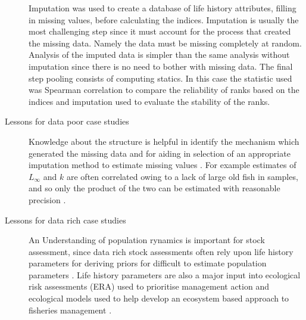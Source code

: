\documentclass[12pt,doublespacing,a4paper]{ouparticle}
\begin{document}
\begin{description}
    Imputation was used to create a database of life history attributes, filling in missing values, before calculating the indices. Imputation is usually the most challenging step since it must account for the process that created the missing data. Namely the data must be missing completely at random. Analysis of the imputed data is simpler than the same analysis without imputation since there is no need to bother with missing data. The final step pooling consists of computing statics. In this case the statistic used was Spearman correlation to compare the reliability of ranks based on the indices and imputation used to evaluate the stability of the ranks. 


 \item[Lessons for data poor case studies]  
    Knowledge about the structure is helpful in identify the mechanism which generated the missing data and for aiding in selection of an appropriate imputation method to estimate missing values \citep{templ2012exploring}. For example estimates of $L_\infty$ and $k$ are often correlated owing to a lack of large old fish in samples, and so only the product of the two can be estimated with reasonable precision \citep{gislason2010does}. 

 \item[Lessons for data rich case studies] 
    An Understanding of population rynamics is important for stock assessment, since data rich stock assessments often rely upon life history parameters for deriving priors for difficult to estimate population parameters \citep{lee2011m, lee2012steepness, jiao2012modelling,simon2012effects}. Life history parameters are also a major input into ecological risk assessments (ERA) used to prioritise management action \citep{suter2006ecological,cortes2010ecological} and ecological models used to help develop an ecosystem based approach to fisheries management \citep{thorson2012using}. 

\end{description}
\end{document}
